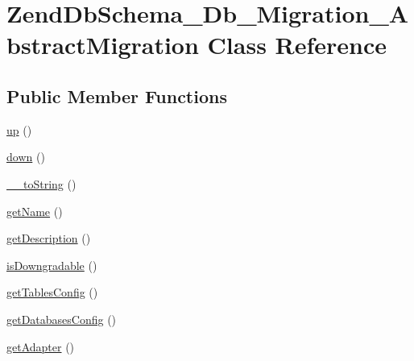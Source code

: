 \hypertarget{classZendDbSchema__Db__Migration__AbstractMigration}{\section{\-Zend\-Db\-Schema\-\_\-\-Db\-\_\-\-Migration\-\_\-\-Abstract\-Migration \-Class \-Reference}
\label{classZendDbSchema__Db__Migration__AbstractMigration}
}
\subsection*{\-Public \-Member \-Functions}
\begin{DoxyCompactItemize}
\item 
\hyperlink{classZendDbSchema__Db__Migration__AbstractMigration_a39f55335402a09467af8463107f63fff}{up} ()
\item 
\hyperlink{classZendDbSchema__Db__Migration__AbstractMigration_adf7af33b5c95128be493930242fd3770}{down} ()
\item 
\hyperlink{classZendDbSchema__Db__Migration__AbstractMigration_aa1b36bd06423087ff912eb14ed39d549}{\-\_\-\-\_\-to\-String} ()
\item 
\hyperlink{classZendDbSchema__Db__Migration__AbstractMigration_a097fd8bd2788978ab159fab98fb9f834}{get\-Name} ()
\item 
\hyperlink{classZendDbSchema__Db__Migration__AbstractMigration_a83e88dd4dd9ca3c03582f3c905dabda8}{get\-Description} ()
\item 
\hyperlink{classZendDbSchema__Db__Migration__AbstractMigration_a81ba42f4ab2d6e288280a37622f3b93c}{is\-Downgradable} ()
\item 
\hyperlink{classZendDbSchema__Db__Migration__AbstractMigration_a1524e261002f5b96cde2fe56ebf24366}{get\-Tables\-Config} ()
\item 
\hyperlink{classZendDbSchema__Db__Migration__AbstractMigration_af0323e3657bc4fe5f49d441dd2e7ac89}{get\-Databases\-Config} ()
\item 
\hyperlink{classZendDbSchema__Db__Migration__AbstractMigration_afe497daed60810ba86df2989f7677e75}{get\-Adapter} ()
\end{DoxyCompactItemize}

